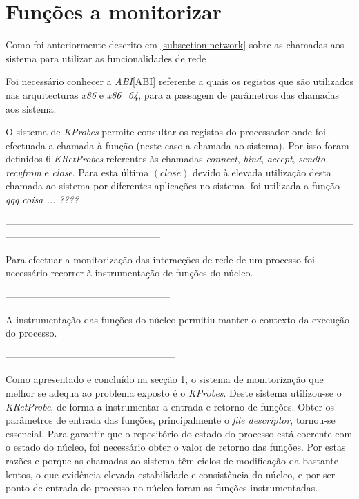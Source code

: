 \section{Funções a monitorizar}

Como foi anteriormente descrito em \ref{subsection:network} sobre as chamadas aos sistema para utilizar as funcionalidades de rede

Foi necessário conhecer a \textit{ABI}\ref{ABI}\cite{ABI} referente a quais os registos que são utilizados nas arquitecturas \textit{x86} e \textit{x86\_64},
para a passagem de parâmetros das chamadas aos sistema.

O sistema de \textit{KProbes} permite consultar os registos do processador onde foi efectuada a chamada à função (neste caso a chamada ao sistema).
 Por isso foram definidos 6 \textit{KRetProbes} referentes às chamadas \textit{connect}, \textit{bind}, \textit{accept}, \textit{sendto}, \textit{recvfrom} e
\textit{close}.
 Para esta última $\left( \textit{close} \right)$ devido à elevada utilização desta chamada ao sistema por diferentes aplicações no sistema, foi utilizada a função \textit{qqq coisa ...  ????}

------------------------------------------------------------------------------------------------------------------------------------------------------------

Para efectuar a monitorização das interacções de rede de um processo foi necessário recorrer à instrumentação de funções do núcleo.

---------------------------------------------------

A instrumentação das funções do núcleo permitiu manter o contexto da execução do processo.

-----------------------------------------------------

Como apresentado e concluído na secção \ref{}, o sistema de monitorização que melhor se adequa ao problema exposto é o \textit{KProbes}.
 Deste sistema utilizou-se o \textit{KRetProbe}, de forma a instrumentar a entrada e retorno de funções.
 Obter os parâmetros de entrada das funções, principalmente o \textit{file descriptor}, tornou-se essencial.
 Para garantir que o repositório do estado do processo está coerente com o estado do núcleo, foi necessário obter o valor de retorno das funções.
 Por estas razões e porque as chamadas ao sistema têm ciclos de modificação da bastante lentos, o que evidência elevada estabilidade e consistência do núcleo, e por ser ponto de entrada do processo no núcleo foram as funções instrumentadas.

